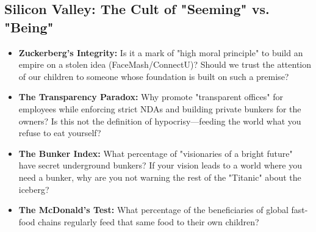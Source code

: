 \documentclass[11pt,a4paper]{article}
\theoremstyle{definition}
\theoremstyle{remark}
\begin{document}

\subsection{Silicon Valley: The Cult of "Seeming" vs. "Being"}

\begin{itemize}
    \item \textbf{Zuckerberg's Integrity:} Is it a mark of "high moral principle" to build an empire on a stolen idea (FaceMash/ConnectU)? Should we trust the attention of our children to someone whose foundation is built on such a premise?
    \item \textbf{The Transparency Paradox:} Why promote "transparent offices" for employees while enforcing strict NDAs and building private bunkers for the owners? Is this not the definition of hypocrisy---feeding the world what you refuse to eat yourself?
    \item \textbf{The Bunker Index:} What percentage of "visionaries of a bright future" have secret underground bunkers? If your vision leads to a world where you need a bunker, why are you not warning the rest of the "Titanic" about the iceberg?
    \item \textbf{The McDonald’s Test:} What percentage of the beneficiaries of global fast-food chains regularly feed that same food to their own children?
\end{itemize}
\end{document}
